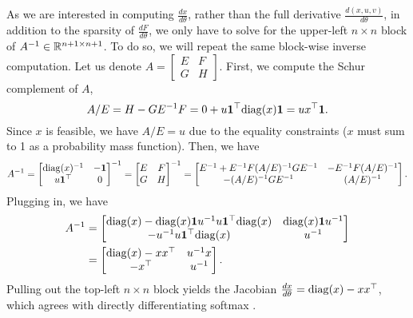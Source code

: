 \documentclass[11pt]{article}
\begin{document}
As we are interested in computing $\frac{dx}{d\theta}$,
rather than the full derivative $\frac{d(x,u,v)}{d\theta}$,
in addition to the sparsity of $\frac{dF}{d\theta}$, 
we only have to solve for the upper-left $n\times n$ block of $A^{-1}\in\mathbb{R}^{n+1\times n+1}$.
To do so, we will repeat the same block-wise inverse computation.
Let us denote $A = \begin{bmatrix}E & F \\ G & H\end{bmatrix}$.
First, we compute the Schur complement of $A$,
\begin{equation}
A/E = H - GE^{-1}F = 0 + u\mathbf{1}^\top\mathrm{diag}(x)\mathbf{1} = ux^\top\mathbf{1}.
\end{equation}
Since $x$ is feasible, we have $A/E = u$ due to the equality constraints
($x$ must sum to 1 as a probability mass function).
Then, we have
\begin{equation}
A^{-1} = \begin{bmatrix}
\mathrm{diag}(x)^{-1} & -\mathbf{1}\\
u\mathbf{1}^\top & 0
\end{bmatrix}^{-1}
=\begin{bmatrix}E & F \\ G & H\end{bmatrix}^{-1}
= \begin{bmatrix}
E^{-1} + E^{-1}F(A/E)^{-1}GE^{-1} & -E^{-1}F(A/E)^{-1}\\
-(A/E)^{-1}GE^{-1} & (A/E)^{-1}
\end{bmatrix}.
\end{equation}
Plugging in, we have
\begin{equation}
\begin{aligned}
A^{-1} 
&= \begin{bmatrix}
\mathrm{diag}(x) - \mathrm{diag}(x)\mathbf{1}u^{-1}u\mathbf{1}^\top\mathrm{diag}(x)
    & \mathrm{diag}(x)\mathbf{1}u^{-1}\\
-u^{-1}u\mathbf{1}^\top \mathrm{diag}(x) & u^{-1}
\end{bmatrix}\\
&= \begin{bmatrix}
\mathrm{diag}(x) - xx^\top
    & u^{-1}x\\
    -x^\top & u^{-1}
\end{bmatrix}.
\end{aligned}
\end{equation}
Pulling out the top-left $n\times n$ block yields
the Jacobian $\frac{d x}{d\theta} = \mathrm{diag}(x) - xx^\top$,
which agrees with directly differentiating softmax \citep{sparsemax}.
\end{document}
